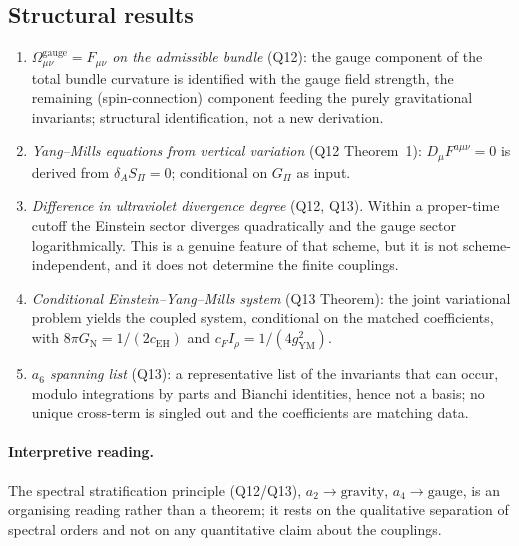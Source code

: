 \documentclass[11pt,a4paper]{article}
\theoremstyle{definition}
\newcommand{\GN}{G_{\mathrm{N}}}
\newcommand{\gYM}{g_{\mathrm{YM}}}
\newcommand{\cEH}{c_{\mathrm{EH}}}
\newcommand{\cF}{c_{F}}
\newcommand{\Irho}{I_\rho}
\newcommand{\SPI}{S_\Pi}
\newcommand{\Gpi}{G_\Pi}
\begin{document}
    \subsection{Structural results}
      \label{sec:structural}

      \begin{enumerate}
        \item \textit{$\Omega^{\mathrm{gauge}}_{\mu\nu} = F_{\mu\nu}$ on the admissible bundle}
        (Q12): the gauge component of the total bundle curvature is identified with the gauge
        field strength, the remaining (spin-connection) component feeding the purely
        gravitational invariants; structural identification, not a new derivation.

        \item \textit{Yang--Mills equations from vertical variation} (Q12 Theorem~1):
        $D_\mu F^{a\mu\nu} = 0$ is derived from $\delta_A \SPI = 0$; conditional on $\Gpi$
        as input.

        \item \textit{Difference in ultraviolet divergence degree} (Q12, Q13).
        Within a proper-time cutoff the Einstein sector diverges quadratically and the gauge
        sector logarithmically. This is a genuine feature of that scheme, but it is not
        scheme-independent, and it does not determine the finite couplings.

        \item \textit{Conditional Einstein--Yang--Mills system} (Q13 Theorem): the joint
        variational problem yields the coupled system, conditional on the matched coefficients,
        with $8\pi\GN = 1/(2\cEH)$ and $\cF\Irho = 1/(4\gYM^2)$.

        \item \textit{$a_6$ spanning list} (Q13): a representative list of the invariants that can
        occur, modulo integrations by parts and Bianchi identities, hence not a basis; no unique
        cross-term is singled out and the coefficients are matching data.
      \end{enumerate}

      \paragraph{Interpretive reading.}
      The spectral stratification principle (Q12/Q13), $a_2 \to \text{gravity}$, $a_4 \to \text{gauge}$, is an
      organising reading rather than a theorem; it rests on the qualitative separation of spectral orders and not
      on any quantitative claim about the couplings.
\end{document}
